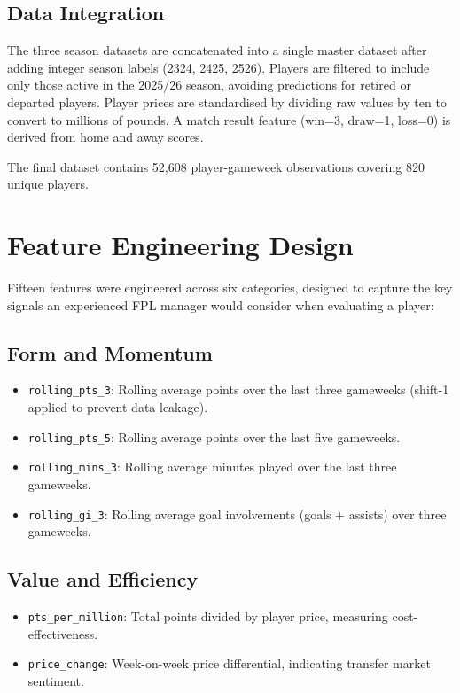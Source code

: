 \documentclass[11pt,english,listoffigures,listoftables]{tfgetsinf}
\begin{document}
\subsection{Data Integration}

The three season datasets are concatenated into a single master dataset after adding integer season labels (2324, 2425, 2526). Players are filtered to include only those active in the 2025/26 season, avoiding predictions for retired or departed players. Player prices are standardised by dividing raw values by ten to convert to millions of pounds. A match result feature (win=3, draw=1, loss=0) is derived from home and away scores.

The final dataset contains 52,608 player-gameweek observations covering 820 unique players.

\section{Feature Engineering Design}

Fifteen features were engineered across six categories, designed to capture the key signals an experienced FPL manager would consider when evaluating a player:

\subsection{Form and Momentum}
\begin{itemize}
    \item \texttt{rolling\_pts\_3}: Rolling average points over the last three gameweeks (shift-1 applied to prevent data leakage).
    \item \texttt{rolling\_pts\_5}: Rolling average points over the last five gameweeks.
    \item \texttt{rolling\_mins\_3}: Rolling average minutes played over the last three gameweeks.
    \item \texttt{rolling\_gi\_3}: Rolling average goal involvements (goals + assists) over three gameweeks.
\end{itemize}

\subsection{Value and Efficiency}
\begin{itemize}
    \item \texttt{pts\_per\_million}: Total points divided by player price, measuring cost-effectiveness.
    \item \texttt{price\_change}: Week-on-week price differential, indicating transfer market sentiment.
\end{itemize}
\end{document}
